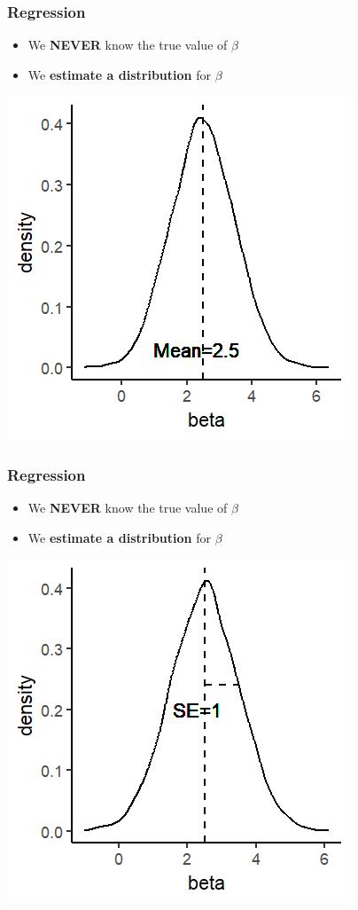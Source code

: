 \documentclass[xcolor=x11names,compress]{beamer}\usepackage[]{graphicx}\usepackage[]{color}
\makeatletter
\def\maxwidth{ %
  \ifdim\Gin@nat@width>\linewidth
    \linewidth
  \else
    \Gin@nat@width
  \fi
}
\newenvironment{knitrout}{}{} %
\renewcommand{\(}{\begin{columns}}
\renewcommand{\)}{\end{columns}}
\newcommand{\<}[1]{\begin{column}{#1}}
\renewcommand{\>}{\end{column}}
\makeatother
\begin{document}
\begin{frame}
\frametitle{Regression}
\begin{itemize}
\item We \textbf{NEVER} know the true value of $\beta$
\item We \textbf{estimate a distribution} for $\beta$
\end{itemize}
\begin{knitrout}
\color{fgcolor}
\includegraphics[width=\maxwidth]{figure/beta_dist2-1} 

\end{knitrout}
\end{frame}

\begin{frame}
\frametitle{Regression}
\begin{itemize}
\item We \textbf{NEVER} know the true value of $\beta$
\item We \textbf{estimate a distribution} for $\beta$
\end{itemize}
\begin{knitrout}
\color{fgcolor}
\includegraphics[width=\maxwidth]{figure/beta_dist3-1} 

\end{knitrout}
\end{frame}
\end{document}
